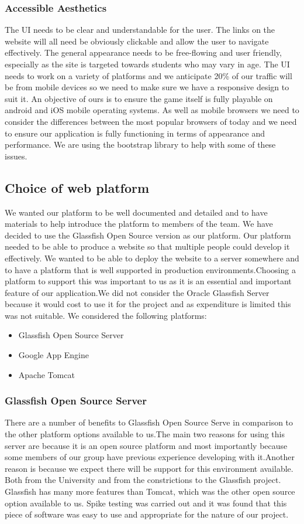\documentclass[titlepage]{article}
\begin{document}
\subsubsection{Accessible Aesthetics}
The UI needs to be clear and understandable for the user. The links on the website will all need be obviously clickable and allow the user to navigate effectively. The general appearance needs to be free-flowing and user friendly, especially as the site is targeted towards students who may vary in age. The UI needs to work on a variety of  platforms and we anticipate 20\% of our traffic will be from mobile devices so we need to make sure we have a responsive design to suit it. An objective of ours is to ensure the game itself is fully playable on android and iOS mobile operating systems. As well as mobile browsers we need to consider the differences between the most popular browsers of today and we need to ensure our application is fully functioning in terms of appearance and performance. We are using the bootstrap library to help with some of these issues. 
\subsection{Choice of web platform}
We wanted our platform to be well documented and detailed and to have materials to help introduce the platform to members of the team. We have decided to use the Glassfish Open Source version as our platform. Our platform needed to be able to produce a website so that multiple people could develop it effectively. We wanted to be able to deploy the website to a server somewhere and to have a platform that is well supported in production environments.Choosing a platform to support this was important to us as it is an essential and important feature of our application.We did not consider the Oracle Glassfish Server because it would cost to use it for the project and as expenditure is limited this was not suitable. We considered the following platforms:\begin{itemize}	
\item{Glassfish Open Source Server}	
\item{Google App Engine}	
\item{Apache Tomcat}
\end{itemize}
\subsubsection{Glassfish Open Source Server}
There are a number of benefits to Glassfish Open Source Serve in comparison to the other platform options available to us.The main two reasons for using this server are because it is an open source platform and most importantly because some members of our group have previous experience developing with it.Another reason is because we expect there will be support for this environment available. Both from the University and from the constrictions to the Glassfish project. Glassfish has many more features than Tomcat, which was the other open source option available to us. Spike testing was carried out and it was found that this piece of software was easy to use and appropriate for the nature of our project.
\end{document}
